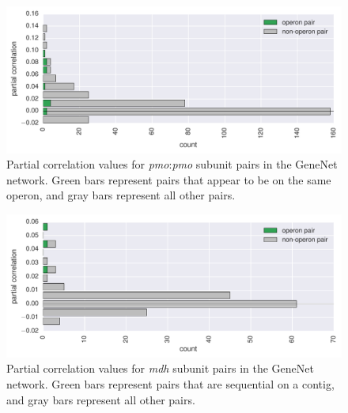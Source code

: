 \begin{figure}[H]
\centering
    \includegraphics[width=1.0\textwidth]{./tex/chapter3/figures/pmo_subunit_pairs_have_higher_pcor--GeneNet--1e+06_edges--horizontal.pdf}
    \begin{singlespace}
    \caption[Partial correlation values for \textit{pmo}:\textit{pmo} subunit pairs]{
    	Partial correlation values for \textit{pmo}:\textit{pmo} subunit pairs in the GeneNet network.
	Green bars represent pairs that appear to be on the same operon, and gray bars represent all other pairs.
        }
    \label{fig:pmo_pcors}
    \end{singlespace}
\end{figure}

\begin{figure}[H]
\centering
    \includegraphics[width=1.0\textwidth]{./tex/chapter3/figures/mdh-mdh_sequential_pairs--GeneNet--1e+06_genes--horizontal.pdf}
    \begin{singlespace}
    \caption[Partial correlation values for \textit{mdh} subunit pairs]{
    	Partial correlation values for \textit{mdh} subunit pairs in the GeneNet network.
	    Green bars represent pairs that are sequential on a contig, and gray bars represent all other pairs.
        }
        \label{fig:mdh_pcors}
    \end{singlespace}
\end{figure}



